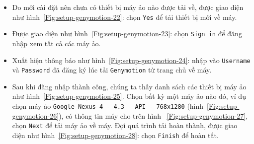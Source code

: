 \documentclass[13pt,a4paper]{extreport}
\begin{document}
\begin{itemize}
\begin{itemize}
					\item Do mới cài đặt nên chưa có thiết bị máy ảo nào được tải về, được giao diện như hình~\ref{Fig:setup-genymotion-22}: chọn \verb|Yes| để tải thiết bị mới về máy.
					
					\item Được giao diện như hình~\ref{Fig:setup-genymotion-23}: chọn \verb|Sign in| để đăng nhập xem tất cả các máy ảo.
					
					\item Xuất hiện thông báo như hình~\ref{Fig:setup-genymotion-24}: nhập vào \verb|Username| và \verb|Password| đã đăng ký lúc tải \verb|Genymotion| từ trang chủ về máy.
					
					\item Sau khi đăng nhập thành công, chúng ta thấy danh sách các thiết bị máy ảo như hình~\ref{Fig:setup-genymotion-25}. Chọn bất kỳ một máy ảo nào đó, ví dụ chọn máy ảo \verb|Google Nexus 4 - 4.3 - API - 768x1280| (hình~\ref{Fig:setup-genymotion-26}), có thông tin máy cho trên hình ~\ref{Fig:setup-genymotion-27}, chọn \verb|Next| để tải máy ảo về máy. Đợi quá trình tải hoàn thành, được giao diện như hình~\ref{Fig:setup-genymotion-28}: chọn \verb|Finish| để hoàn tất.
						\begin{figure}[!h]
							\begin{center}	
								\hspace{.5cm}
								\\

\end{center}
\end{figure}
\end{itemize}
\end{itemize}
\end{document}
